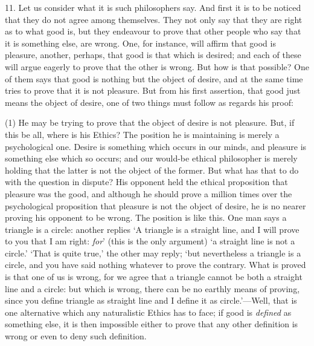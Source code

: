 11. Let us consider what it is such philosophers say. And first it is
to be noticed that they do not agree among themselves.  They
not only say that they are right as to what good is, but they
endeavour to prove that other people who say that it is something
else, are wrong. One, for instance, will affirm that good is pleasure,
another, perhaps, that good is that which is desired; and each of
these will argue eagerly to prove that the other is wrong. But how is
that possible? One of them says that good is nothing but the object of
desire, and at the same time tries to prove that it is not pleasure.
But from his first assertion, that good just means the object of
desire, one of two things must follow as regards his proof:

(1) He may be trying to prove that the object of desire is not
pleasure. But, if this be all, where is his Ethics? The position he is
maintaining is merely a psychological one. Desire is something which
occurs in our minds, and pleasure is something else which so occurs;
and our would-be ethical philosopher is merely holding that the latter
is not the object of the former. But what has that to do with the
question in dispute? His opponent held the ethical proposition that
pleasure was the good, and although he should prove a million times
over the psychological proposition that pleasure is not the object of
desire, he is no nearer proving his opponent to be wrong. The position
is like this. One man says a triangle is a circle: another replies `A
triangle is a straight line, and I will prove to you that I am right:
\textit{for}' (this is the only argument) `a straight line is not a
circle.' `That is quite true,' the other may reply; `but nevertheless
a triangle is a circle, and you have said nothing whatever to prove
the contrary. What is proved is that one of us is wrong, for we agree
that a triangle cannot be both a straight line and a circle: but which
is wrong, there can be no earthly means of proving, since you define
triangle as straight line and I define it as circle.'---Well, that is
one alternative which any naturalistic Ethics has to face; if good is
\textit{defined} as something else, it is then impossible either to
prove that any other definition is wrong or even to deny such
definition.

